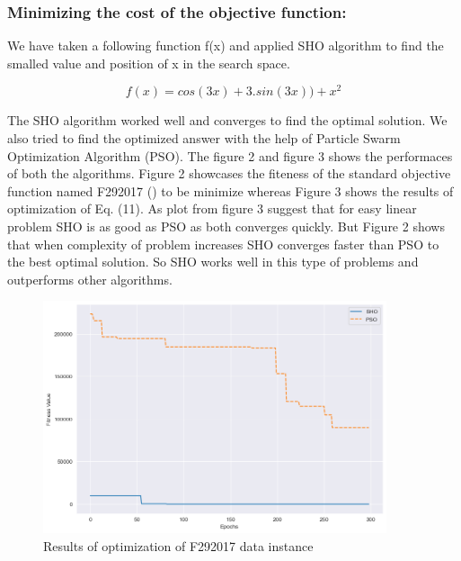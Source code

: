 \documentclass[12pt]{article}
\begin{document}
\subsubsection{Minimizing the cost of the objective function: }
We have taken a following function f(x) and applied SHO algorithm to find the smalled value and position of x in the search space. 

\begin{equation}
    f(x) = cos(3x)+ 3.sin(3x)) + x^2
\end{equation}

The SHO algorithm worked well and converges to find the optimal solution. We also tried to find the optimized answer with the help of Particle Swarm Optimization Algorithm (PSO). The figure 2 and figure 3 shows the performaces of both the algorithms. 
Figure 2 showcases the fiteness of the standard objective function named F292017 (\cite{thieu_nguyen_2020_3711682}) to be minimize whereas Figure 3 shows the results of optimization of Eq. (11). As plot from figure 3 suggest that for easy linear problem SHO is as good as PSO as both converges quickly. But Figure 2 shows that when complexity of problem increases SHO converges faster than PSO to the best optimal solution. 
So SHO works well in this type of problems and outperforms other algorithms.

\begin{figure}
  \centering
      \includegraphics[width=0.9\textwidth]{F4_F29_data_fitness.png}
  \caption{Results of optimization of F292017 data instance}
\end{figure}
\end{document}
